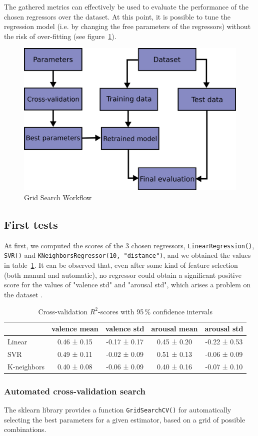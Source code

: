 The gathered metrics can effectively be used to evaluate the performance of the chosen regressors over the dataset. At this point, it is possible to tune the regression model (i.e. by changing the free parameters of the regressors) without the risk of over-fitting (see figure~\ref{fig:grid-search-workflow}).

\begin{figure}
	\centering
	\includegraphics[width=0.5\linewidth]{assets/grid_search_workflow.png}
	\caption{Grid Search Workflow \cite{sklearn-crossval}}
	\label{fig:grid-search-workflow}
\end{figure}


\subsection{First tests}\label{sec:first-tests}

At first, we computed the scores of the 3 chosen regressors, \texttt{LinearRegression()}, \texttt{SVR()} and \texttt{KNeighborsRegressor(10, "distance")}, and we obtained the values in table~\ref{table:cross-scores}. It can be observed that, even after some kind of feature selection (both manual and automatic), no regressor could obtain a significant positive score for the values of "valence std" and "arousal std", which arises a problem on the dataset .

\begin{table}
	\centering
	\begin{tabular}{lcccc}
		\toprule
		& valence mean & valence std & arousal mean & arousal std \\
		\midrule
		Linear & 0.46 ± 0.15 & -0.17 ± 0.17 & 0.45 ± 0.20 & -0.22 ± 0.53 \\
		SVR & 0.49 ± 0.11 & -0.02 ± 0.09 & 0.51 ± 0.13 & -0.06 ± 0.09 \\
		K-neighbors & 0.40 ± 0.08 & -0.06 ± 0.09 & 0.40 ± 0.16 & -0.07 ± 0.10 \\
		\bottomrule
	\end{tabular}
	\caption{Cross-validation $R^2$-scores with 95\,\% confidence intervals}
	\label{table:cross-scores}
\end{table}


\subsubsection{Automated cross-validation search}

The sklearn library provides a function \texttt{GridSearchCV()} for automatically selecting the best parameters for a given estimator, based on a grid of possible combinations.

